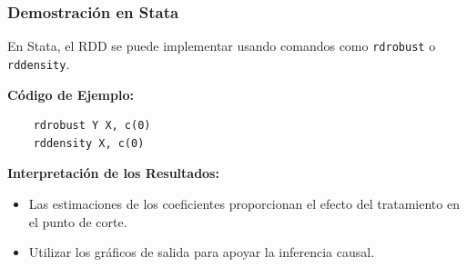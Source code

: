 \documentclass[notes,10pt,aspectratio=169]{beamer}
\begin{document}
\begin{frame}[fragile]
  \frametitle{Demostración en Stata}

  En Stata, el RDD se puede implementar usando comandos como \texttt{rdrobust} o \texttt{rddensity}.

  \vspace{1em}
  \textbf{Código de Ejemplo:}
  \begin{verbatim}
    rdrobust Y X, c(0)
    rddensity X, c(0)
  \end{verbatim}

  \vspace{1em}
  \textbf{Interpretación de los Resultados:}
  \begin{itemize}
    \item Las estimaciones de los coeficientes proporcionan el efecto del tratamiento en el punto de corte.
    \item Utilizar los gráficos de salida para apoyar la inferencia causal.
  \end{itemize}
\end{frame}

\end{document}
